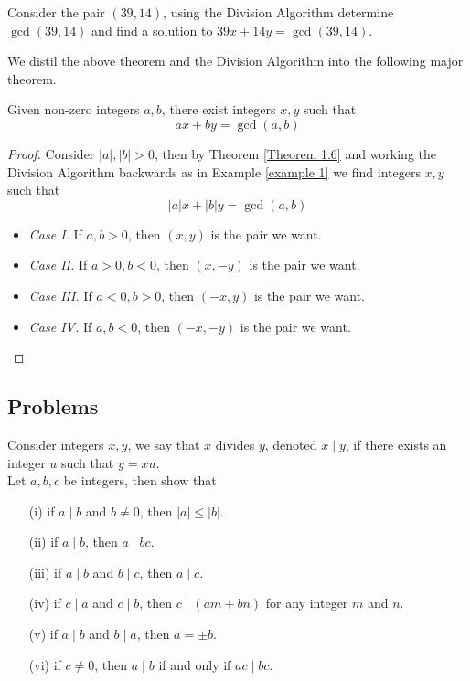\vspace*{1em}

\begin{example}[in-class]
Consider the pair $(39,14)$, using the Division Algorithm determine $\gcd(39,14)$ and find a solution to $39x + 14y = \gcd(39,14)$.
\end{example}


We distil the above theorem and the Division Algorithm into the following major theorem.
\begin{theorem}
Given non-zero integers $a,b$, there exist integers $x,y$ such that
\[ax + by = \gcd(a,b)\]
\end{theorem}
\begin{proof}
Consider $|a|,|b|>0$, then by Theorem \ref{Theorem 1.6} and working the Division Algorithm backwards as in Example \ref{example 1} we find integers $x,y$ such that 
\[|a|x + |b|y = \gcd(a,b)\]
\begin{itemize}
\item \emph{Case I.} If $a,b>0$, then $(x,y)$ is the pair we want.
\item \emph{Case II.} If $a>0,b<0$, then $(x,-y)$ is the pair we want.
\item \emph{Case III.} If $a<0,b>0$, then $(-x,y)$ is the pair we want.
\item \emph{Case IV.} If $a,b<0$, then $(-x,-y)$ is the pair we want.
\end{itemize}
\vspace*{-1.2\baselineskip}
\end{proof}

\vspace*{0.2in}

\subsection{Problems}
\vspace{0.1in}

\begin{problem}[Divisibility]\label{div a}
Consider integers $x,y$, we say that $x$ divides $y$, denoted $x\mid y$, if there exists an integer $u$ such that $y = xu$.\\[0.5em]
Let $a,b,c$ be integers, then show that
\begin{itemize}
\item[(i)] if $a\mid b$ and $b \neq 0$, then $|a| \leq |b|$.
\item[(ii)] if $a\mid b$, then $a\mid bc$.
\item[(iii)] if $a\mid b$ and $b\mid c$, then $a\mid c$.
\item[(iv)] if $c\mid a$ and $c\mid b$, then $c\mid (am + bn)$ for any integer $m$ and $n$.
\item[(v)] if $a\mid b$ and $b\mid a$, then $a = \pm b$.
\item[(vi)] if $c \neq 0$, then $a\mid b$ if and only if $ac\mid bc$.
\end{itemize}
\end{problem}

